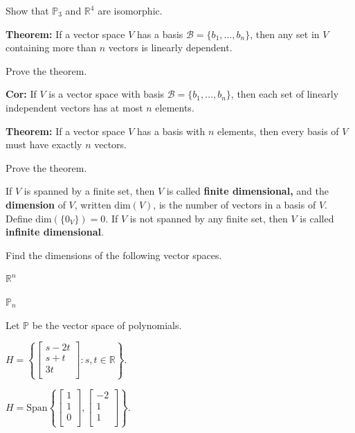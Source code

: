 \begin{enumerate}

\Problem Show that $\mathbb{P}_3$ and $\mathbb{R}^4$ are isomorphic.

\vfill

{\bf Theorem:} If a vector space $V$ has a basis $\mathcal{B}=\{b_1, \dots, b_n\}$, then any set in $V$ containing more than $n$ vectors is linearly dependent.

\Problem Prove the theorem.

\vfill

{\bf Cor:} If $V$ is a vector space with basis $\mathcal{B}=\{b_1, \dots, b_n\}$, then each set of linearly independent vectors has at most $n$ elements.

{\bf Theorem:} If a vector space $V$ has a basis with $n$ elements, then every basis of $V$ must have exactly $n$ vectors.

\Problem Prove the theorem.

\vfill

\newpage

\begin{defn}
If $V$ is spanned by a finite set, then $V$ is called {\bf finite dimensional,} and the {\bf dimension} of $V$, written $\text{dim}(V)$, is the number of vectors in a basis of $V$. Define $\text{dim}(\{0_V\})=0$. If $V$ is not spanned by any finite set, then $V$ is called {\bf infinite dimensional}.
\end{defn}




\Problem Find the dimensions of the following vector spaces.

\Part $\mathbb{R}^n$

\vfill

\Part $\mathbb{P}_n$

\vfill

\Part Let $\mathbb{P}$ be the vector space of polynomials.

\vfill

\Part $H=\left\{\begin{bmatrix} s-2t\\ s+t\\ 3t\\ \end{bmatrix} : s,t \in \mathbb{R} \right\}$.

\vfill

\Part $H=\text{Span}\left\{ \begin{bmatrix} 1\\ 1\\ 0\\ \end{bmatrix}, \begin{bmatrix} -2\\ 1\\ 1\\ \end{bmatrix}\right\}$.


\end{enumerate}
